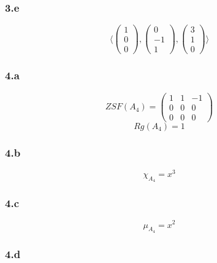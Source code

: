 \documentclass[10pt,a4paper]{article}
\begin{document}
\subsubsection*{3.e}

\begin{equation}
\langle
\begin{pmatrix}
1\\0\\0
\end{pmatrix},
\begin{pmatrix}
0\\-1\\1
\end{pmatrix},
\begin{pmatrix}
3\\1\\0
\end{pmatrix}
\rangle
\end{equation}

\subsubsection*{4.a}

\begin{equation}
ZSF(A_{4}) = 
\begin{pmatrix}
1 & 1 & -1\\
0 & 0 & 0\\
0 & 0 & 0
\end{pmatrix}
\end{equation}
\begin{equation}
Rg(A_{4}) = 1
\end{equation}

\subsubsection*{4.b}

\begin{equation}
\chi_{A_{4}} = x^{3}
\end{equation}

\subsubsection*{4.c}

\begin{equation}
\mu_{A_{4}} = x^{2}
\end{equation}

\subsubsection*{4.d}
\end{document}
